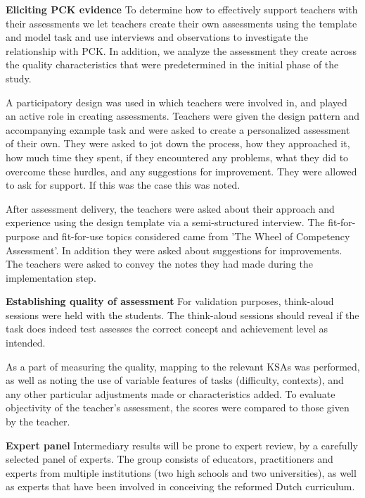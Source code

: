 \noindent\textbf{Eliciting PCK evidence}\newline
To determine how to effectively support teachers with their assessments we let teachers create their own assessments using the template and model task and use interviews and observations to investigate the relationship with PCK. In addition, we analyze the assessment they create across the quality characteristics that were predetermined in the initial phase of the study.

A participatory design was used in which teachers were involved in, and played an active role in creating assessments. Teachers were given the design pattern and accompanying example task and were asked to create a personalized assessment of their own. They were asked to jot down the process, how they approached it, how much time they spent, if they encountered any problems, what they did to overcome these hurdles, and any suggestions for improvement. They were allowed to ask for support. If this was the case this was noted.


After assessment delivery, the teachers were asked about their approach and experience using the design template via a semi-structured interview. The fit-for-purpose and fit-for-use topics considered came from 'The Wheel of Competency Assessment'. In addition they were asked about suggestions for improvements. The teachers were asked to convey the notes they had made during the implementation step.



\noindent\textbf{Establishing quality of assessment}\newline
For validation purposes, think-aloud sessions were held with the students. The think-aloud sessions should reveal if the task does indeed test assesses the correct concept and achievement level as intended.

As a part of measuring the quality, mapping to the relevant KSAs was performed, as well as noting the use of variable features of tasks (difficulty, contexts), and any other particular adjustments made or characteristics added. To evaluate objectivity of the teacher's assessment, the scores were compared to those given by the teacher.

\noindent\textbf{Expert panel}\newline
Intermediary results will be prone to expert review, by a carefully selected panel of experts. The group consists of educators, practitioners and experts from multiple institutions (two high schools and two universities), as well as experts that have been involved in conceiving the reformed Dutch curriculum.

